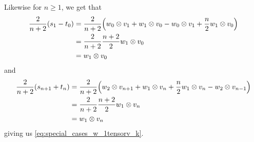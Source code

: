 Likewise for $n\geq 1$, we get that
\begin{align*}
  \dfrac{2}{n+2}(s_1-t_0) &= \dfrac{2}{n+2}\Bigl( w_0\otimes v_1 + w_1\otimes v_0 - w_0\otimes v_1 + \dfrac{n}{2}w_1\otimes v_0 \Bigr) \\
  &= \dfrac{2}{n+2}\dfrac{n+2}{2}w_1\otimes v_0 \\
  &= w_1\otimes v_0
\end{align*}
and
\begin{align*}
  \dfrac{2}{n+2}(s_{n+1}+t_n) &= \dfrac{2}{n+2}\Bigl( w_2\otimes v_{n+1} + w_1\otimes v_n + \dfrac{n}{2}w_1\otimes v_n - w_2\otimes v_{n-1} \Bigr)\\
                              &= \dfrac{2}{n+2}\dfrac{n+2}{2} w_1\otimes v_n \\
  &= w_1\otimes v_n
\end{align*}
giving us \cref{eq:special_cases_w_1tensorv_k}.

